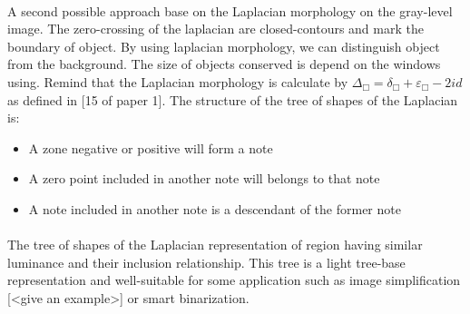 \documentclass[12pt,a4paper]{report}
\begin{document}
\paragraph{}
A second possible approach base on the Laplacian morphology on the gray-level image. The zero-crossing of the laplacian are closed-contours and mark the boundary of object. By using laplacian morphology, we can distinguish object from the background. The size of objects conserved is depend on the windows using. Remind that the Laplacian morphology is calculate by $ \Delta_\Box = \delta_\Box + \varepsilon_\Box -2id $ as defined in [15 of paper 1]. The structure of the tree of shapes of the Laplacian is:
\begin{itemize}
\item A zone negative or positive will form a note
\item A zero point included in another note will belongs to that note
\item A note included in another note is a descendant of the former note
\end{itemize}
\paragraph{}
The tree of shapes of the Laplacian representation of region having similar luminance and their inclusion relationship. This tree is a light tree-base representation and well-suitable for some application such as image simplification [<give an example>] or smart binarization.
\end{document}
